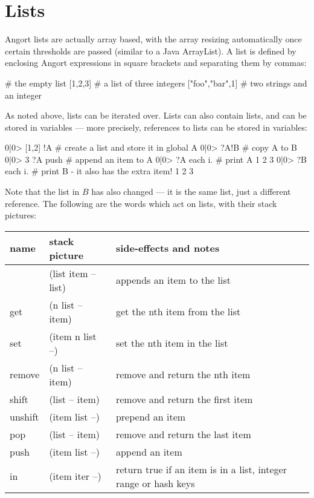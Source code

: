 \section{Lists}
Angort lists are actually array based, with the array resizing automatically
once certain thresholds are passed (similar to a Java ArrayList).
A list is defined by enclosing Angort expressions in square
brackets and separating them by commas:
\begin{v}
[]              # the empty list
[1,2,3]         # a list of three integers
["foo","bar",1] # two strings and an integer
\end{v}
As noted above, lists can be iterated over. Lists can also contain lists,
and can be stored in variables ---  more precisely, references to lists can
be stored in variables:
\begin{v}
0|0> [1,2] !A       # create a list and store it in global A
0|0> ?A!B           # copy A to B
0|0> 3 ?A push      # append an item to A
0|0> ?A each {i.}   # print A
1
2
3
0|0> ?B each {i.}   # print B - it also has the extra item!
1
2
3
\end{v}
Note that the list in $B$ has also changed --- it is the same list,
just a different reference.
The following are the words which act on lists, with their stack pictures:
\begin{center}
\begin{tabular}{|l|l|p{4in}|}\hline
\textbf{name} & \textbf{stack picture} & \textbf{side-effects and notes}\\ \hline
[    & (-- list)    & creates a new list\\
,    & (list item -- list) & appends an item to the list\\
]    & (list item -- list) & appends an item to the list\\
get & (n list -- item) & get the nth item from the list\\
set & (item n list --) & set the nth item in the list\\
remove & (n list -- item) & remove and return the nth item\\
shift & (list -- item) & remove and return the first item\\
unshift & (item list --) & prepend an item\\
pop & (list -- item) & remove and return the last item\\
push & (item list --) & append an item\\
in & (item iter --) & return true if an item is in a list, integer range or hash keys\\
\hline
\end{tabular}
\end{center}
